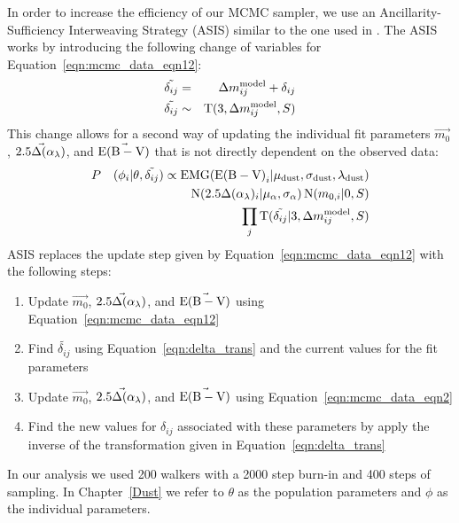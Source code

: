 In order to increase the efficiency of our MCMC sampler, we use an Ancillarity-Sufficiency Interweaving Strategy (ASIS) similar to the one used in \citet{Kelly:2011} \citep[see also ][]{Yu:2011}.  The ASIS works by introducing the following change of variables for Equation~\ref{eqn:mcmc_data_eqn12}:
\begin{eqnarray}
\tilde{\delta_{ij}} &=& \mrel_{ij}^{\rm model}+\delta_{ij}  \label{eqn:delta_trans} \\
\tilde{\delta_{ij}} &\sim& \operatorname{T}(3,\mrel_{ij}^{\rm model},S) 
\end{eqnarray}
This change allows for a second way of updating the individual fit parameters $\vec{m_{0}}$, $\vec{2.5\Delta(\alpha_{\lambda})}$, and $\vec{{\rm E(B-V)}}$ that is not directly dependent on the observed data:
\begin{eqnarray} \label{eqn:mcmc_data_eqn2}
&P&(\phi_i|\theta,\tilde{\delta_{ij}}) \propto \operatorname{EMG}(\ebv_i|\mu_{\rm dust},\sigma_{\rm dust},\lambda_{\rm dust}) \nonumber \\
& & \operatorname{N}(2.5\dal_i|\mu_{\alpha},\sigma_{\alpha}) \operatorname{N}(m_{0,i}|0,S) \nonumber \\
& & \prod_j \operatorname{T}(\tilde{\delta_{ij}}|3,\mrel_{ij}^{\rm model},S)
\end{eqnarray}
ASIS replaces the update step given by Equation~\ref{eqn:mcmc_data_eqn12} with the following steps:
\begin{enumerate}
    \item{Update $\vec{m_{0}}$, $\vec{2.5\Delta(\alpha_{\lambda})}$, and $\vec{{\rm E(B-V)}}$ using Equation~\ref{eqn:mcmc_data_eqn12}}
    \item{Find $\tilde{\delta_{ij}}$ using Equation~\ref{eqn:delta_trans} and the current values for the fit parameters}
    \item{Update $\vec{m_{0}}$, $\vec{2.5\Delta(\alpha_{\lambda})}$, and $\vec{{\rm E(B-V)}}$ using Equation~\ref{eqn:mcmc_data_eqn2}}
    \item{Find the new values for $\delta_{ij}$ associated with these parameters by apply the inverse of the transformation given in Equation~\ref{eqn:delta_trans}}
\end{enumerate}

In our analysis we used 200 walkers with a 2000 step burn-in and 400 steps of sampling.  In Chapter~\ref{Dust} we refer to $\theta$ as the population parameters and $\phi$ as the individual parameters.
